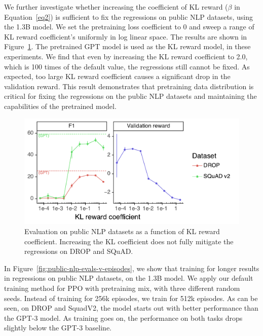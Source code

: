 \documentclass{article}
\begin{document}
We further investigate whether increasing the coefficient of KL reward ($\beta$ in Equation~\ref{eq2}) is sufficient to fix the regressions on public NLP datasets, using the 1.3B model. We set the pretraining loss coefficient to 0 and sweep a range of KL reward coefficient’s uniformly in log linear space. The results are shown in Figure~\ref{fig:public-nlp-evals-v-kl}. The pretrained GPT model is used as the KL reward model, in these experiments. We find that even by increasing the KL reward coefficient to 2.0, which is 100 times of the default value, the regressions still cannot be fixed. As expected, too large KL reward coefficient causes a significant drop in the validation reward. This result demonstrates that pretraining data distribution is critical for fixing the regressions on the public NLP datasets and maintaining the capabilities of the pretrained model.

\begin{figure}
    \centering
    \includegraphics[width=\linewidth]{figs/academic-evals-v-kl.pdf}
    \caption{Evaluation on public NLP datasets as a function of KL reward coefficient. Increasing the KL coefficient does not fully mitigate the regressions on DROP and SQuAD.}
    \label{fig:public-nlp-evals-v-kl}
\end{figure}

In Figure~\ref{fig:public-nlp-evals-v-episodes}, we show that training for longer results in regressions on public NLP datasets, on the 1.3B model. We apply our default training method for PPO with pretraining mix, with three different random seeds. Instead of training for 256k episodes, we train for 512k episodes. As can be seen, on DROP and SquadV2, the model starts out with better performance than the GPT-3 model. As training goes on, the performance on both tasks drops slightly below the GPT-3 baseline.
\end{document}
